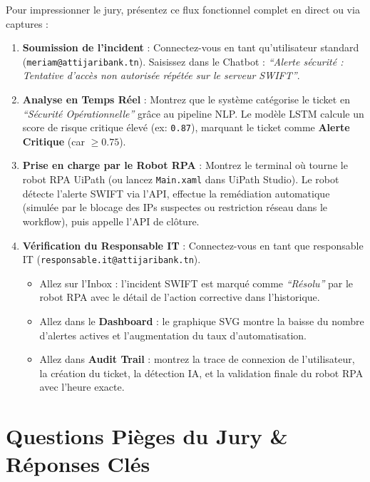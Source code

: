\documentclass[11pt,a4paper]{article}
\begin{document}
Pour impressionner le jury, présentez ce flux fonctionnel complet en direct ou via captures :
\begin{enumerate}
    \item \textbf{Soumission de l'incident} : Connectez-vous en tant qu'utilisateur standard (\texttt{meriam@attijaribank.tn}). Saisissez dans le Chatbot : \textit{``Alerte sécurité : Tentative d'accès non autorisée répétée sur le serveur SWIFT''}.
    \item \textbf{Analyse en Temps Réel} : Montrez que le système catégorise le ticket en \textit{``Sécurité Opérationnelle''} grâce au pipeline NLP. Le modèle LSTM calcule un score de risque critique élevé (ex: \texttt{0.87}), marquant le ticket comme \textbf{Alerte Critique} (car $\ge 0.75$).
    \item \textbf{Prise en charge par le Robot RPA} : Montrez le terminal où tourne le robot RPA UiPath (ou lancez \texttt{Main.xaml} dans UiPath Studio). Le robot détecte l'alerte SWIFT via l'API, effectue la remédiation automatique (simulée par le blocage des IPs suspectes ou restriction réseau dans le workflow), puis appelle l'API de clôture.
    \item \textbf{Vérification du Responsable IT} : Connectez-vous en tant que responsable IT (\texttt{responsable.it@attijaribank.tn}). 
    \begin{itemize}
        \item Allez sur l'Inbox : l'incident SWIFT est marqué comme \textit{``Résolu''} par le robot RPA avec le détail de l'action corrective dans l'historique.
        \item Allez dans le \textbf{Dashboard} : le graphique SVG montre la baisse du nombre d'alertes actives et l'augmentation du taux d'automatisation.
        \item Allez dans \textbf{Audit Trail} : montrez la trace de connexion de l'utilisateur, la création du ticket, la détection IA, et la validation finale du robot RPA avec l'heure exacte.
    \end{itemize}
\end{enumerate}

\section{Questions Pièges du Jury \& Réponses Clés}
\end{document}
